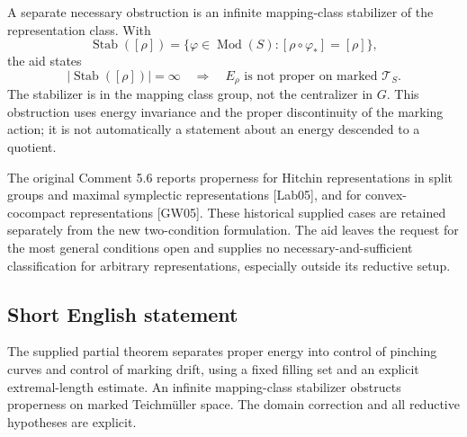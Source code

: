 \documentclass[11pt]{article}
\begin{document}
A separate necessary obstruction is an infinite mapping-class stabilizer of the representation class. With
\[
 \operatorname{Stab}([\rho])=\{\varphi\in\operatorname{Mod}(S):[\rho\circ\varphi_*]=[\rho]\},
\]
the aid states
\[
 |\operatorname{Stab}([\rho])|=\infty\quad\Longrightarrow\quad E_\rho\text{ is not proper on marked }\mathcal T_S.
\]
The stabilizer is in the mapping class group, not the centralizer in \(G\). This obstruction uses energy invariance and the proper discontinuity of the marking action; it is not automatically a statement about an energy descended to a quotient.

The original Comment 5.6 reports properness for Hitchin representations in split groups and maximal symplectic representations [Lab05], and for convex-cocompact representations [GW05]. These historical supplied cases are retained separately from the new two-condition formulation. The aid leaves the request for the most general conditions open and supplies no necessary-and-sufficient classification for arbitrary representations, especially outside its reductive setup.
\subsection{Short English statement}
The supplied partial theorem separates proper energy into control of pinching curves and control of marking drift, using a fixed filling set and an explicit extremal-length estimate. An infinite mapping-class stabilizer obstructs properness on marked Teichm\"uller space. The domain correction and all reductive hypotheses are explicit.
\end{document}
